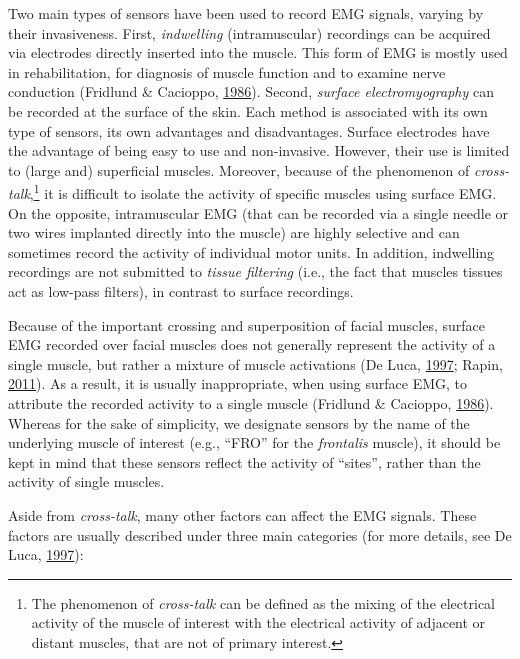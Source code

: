 \documentclass[a4paper,12pt,twoside,onecolumn,openright,final,oldfontcommands]{memoir}
\let\rmarkdownfootnote\footnote%
\def\footnote{\protect\rmarkdownfootnote}
\begin{document}
Two main types of sensors have been used to record EMG signals, varying by their invasiveness. First, \emph{indwelling} (intramuscular) recordings can be acquired via electrodes directly inserted into the muscle. This form of EMG is mostly used in rehabilitation, for diagnosis of muscle function and to examine nerve conduction (Fridlund \& Cacioppo, \protect\hyperlink{ref-fridlund_guidelines_1986}{1986}). Second, \emph{surface electromyography} can be recorded at the surface of the skin. Each method is associated with its own type of sensors, its own advantages and disadvantages. Surface electrodes have the advantage of being easy to use and non-invasive. However, their use is limited to (large and) superficial muscles. Moreover, because of the phenomenon of \emph{cross-talk},\footnote{The phenomenon of \emph{cross-talk} can be defined as the mixing of the electrical activity of the muscle of interest with the electrical activity of adjacent or distant muscles, that are not of primary interest.} it is difficult to isolate the activity of specific muscles using surface EMG. On the opposite, intramuscular EMG (that can be recorded via a single needle or two wires implanted directly into the muscle) are highly selective and can sometimes record the activity of individual motor units. In addition, indwelling recordings are not submitted to \emph{tissue filtering} (i.e., the fact that muscles tissues act as low-pass filters), in contrast to surface recordings.

Because of the important crossing and superposition of facial muscles, surface EMG recorded over facial muscles does not generally represent the activity of a single muscle, but rather a mixture of muscle activations (De Luca, \protect\hyperlink{ref-de_luca_use_1997}{1997}; Rapin, \protect\hyperlink{ref-Rapin2011}{2011}). As a result, it is usually inappropriate, when using surface EMG, to attribute the recorded activity to a single muscle (Fridlund \& Cacioppo, \protect\hyperlink{ref-fridlund_guidelines_1986}{1986}). Whereas for the sake of simplicity, we designate sensors by the name of the underlying muscle of interest (e.g., \enquote{FRO} for the \emph{frontalis} muscle), it should be kept in mind that these sensors reflect the activity of \enquote{sites}, rather than the activity of single muscles.

Aside from \emph{cross-talk}, many other factors can affect the EMG signals. These factors are usually described under three main categories (for more details, see De Luca, \protect\hyperlink{ref-de_luca_use_1997}{1997}):
\end{document}
